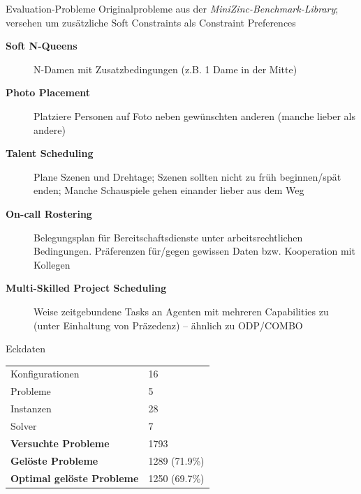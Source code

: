 \begin{frame}{Evaluation-Probleme}
Originalprobleme aus der \emph{MiniZinc-Benchmark-Library}; versehen um zusätzliche Soft Constraints als Constraint Preferences

\vspace*{1ex}

\begin{description}
\item[\textbf{Soft N-Queens}] N-Damen mit Zusatzbedingungen (z.B. 1 Dame in der Mitte)
\item[\textbf{Photo Placement}] Platziere Personen auf Foto neben gewünschten anderen (manche lieber als andere)
\item[\textbf{Talent Scheduling}] Plane Szenen und Drehtage; Szenen sollten nicht zu früh beginnen/spät enden; Manche Schauspiele gehen einander lieber aus dem Weg
\item[\textbf{On-call Rostering}] Belegungsplan für Bereitschaftsdienste unter arbeitsrechtlichen Bedingungen. Präferenzen für/gegen gewissen Daten bzw. Kooperation mit Kollegen
\item[\textbf{Multi-Skilled Project Scheduling}] Weise zeitgebundene Tasks an Agenten mit mehreren Capabilities zu (unter Einhaltung von Präzedenz) -- ähnlich zu ODP/COMBO
\end{description}

\end{frame}

\begin{frame}{Eckdaten}

\begin{table}
\centering
{
\label{tab:resultsSolverComparison}

\begin{tabular}{l|l}
\toprule
Konfigurationen &  16 \\
Probleme & 5 \\
Instanzen & 28 \\
Solver & 7 \\
\midrule
\textbf{Versuchte Probleme} & 1793 \\
\textbf{Gelöste Probleme} & 1289 (71.9\%) \\
\textbf{Optimal gelöste Probleme} & 1250 (69.7\%) \\
\bottomrule
\end{tabular}

}
\end{table}
\end{frame}

